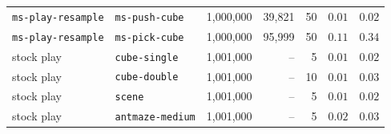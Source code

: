 \documentclass[10pt]{article}
\begin{document}
\begin{table}[h]
\begin{tabular}{ll rrr rr}
\midrule
\texttt{ms-play-resample} & \texttt{ms-push-cube} & 1{,}000{,}000 & 39{,}821 & 50 & $0.01$ & $0.02$ \\
\texttt{ms-play-resample} & \texttt{ms-pick-cube} & 1{,}000{,}000 & 95{,}999 & 50 & $0.11$ & $0.34$ \\
\midrule
stock play & \texttt{cube-single} & 1{,}001{,}000 & -- & 5 & $0.01$ & $0.02$ \\
stock play & \texttt{cube-double} & 1{,}001{,}000 & -- & 10 & $0.01$ & $0.03$ \\
stock play & \texttt{scene} & 1{,}001{,}000 & -- & 5 & $0.01$ & $0.02$ \\
stock play & \texttt{antmaze-medium} & 1{,}001{,}000 & -- & 5 & $0.02$ & $0.03$ \\
\bottomrule
\end{tabular}
\end{table}
\end{document}
